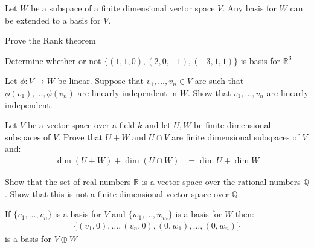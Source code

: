 \documentclass[final,expand]{problemset}
\begin{document}
\problem
Let $W$ be a subspace of a finite dimensional vector space $V$. Any basis for $W$ can be extended to a basis for $V$.

\problem
Prove the Rank theorem

\problem
Determine whether or not $\{(1, 1, 0), (2, 0, -1), (-3, 1, 1)\}$ is basis for $\mathbb{R}^3$

\problem
Let $\phi: V \to W$ be linear. Suppose that $v_1, \dots, v_n \in V$ are such that $\phi(v_1), \dots, \phi(v_n)$ are linearly independent in $W$. Show that $v_1, \dots, v_n$ are linearly independent.


\problem
Let $V$ be a vector space over a field $k$ and let $U, W$ be finite dimensional subspaces of $V$. Prove that $U + W$ and $U \cap V$ are finite dimensional subspaces of $V$ and:
\begin{align*}
	\dim(U + W) + \dim(U \cap W) &= \dim U + \dim W
\end{align*}

\problem
Show that the set of real numbers $\mathbb{R}$ is a vector space over the rational numbers $\mathbb{Q}$. Show that this is not a finite-dimensional vector space over $\mathbb{Q}$.

\problem
If $\{v_1, \dots, v_n\}$ is a basis for $V$ and $\{w_1, \dots, w_m\}$ is a basis for $W$ then:
\begin{align*}
	\{(v_1, 0), \dots, (v_n, 0), (0, w_1), \dots, (0, w_n)\}
\end{align*}
is a basis for $V \oplus W$
\end{document}
